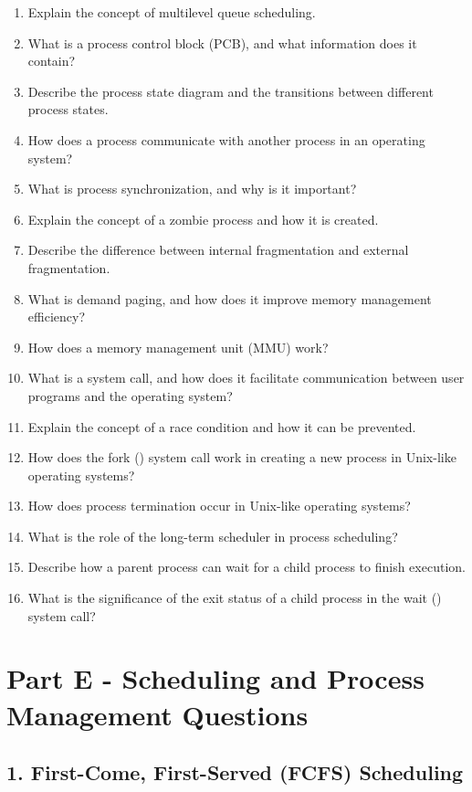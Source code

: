 \begin{enumerate}
  it used?
\item
  Explain the concept of multilevel queue scheduling.
\item
  What is a process control block (PCB), and what information does it
  contain?
\item
  Describe the process state diagram and the transitions between
  different process states.
\item
  How does a process communicate with another process in an operating
  system?
\item
  What is process synchronization, and why is it important?
\item
  Explain the concept of a zombie process and how it is created.
\item
  Describe the difference between internal fragmentation and external
  fragmentation.
\item
  What is demand paging, and how does it improve memory management
  efficiency?
\item
  How does a memory management unit (MMU) work?
\item
  What is a system call, and how does it facilitate communication
  between user programs and the operating system?
\item
  Explain the concept of a race condition and how it can be prevented.
\item
  How does the fork () system call work in creating a new process in
  Unix-like operating systems?
\item
  How does process termination occur in Unix-like operating systems?
\item
  What is the role of the long-term scheduler in process scheduling?
\item
  Describe how a parent process can wait for a child process to finish
  execution.
\item
  What is the significance of the exit status of a child process in the
  wait () system call?
\end{enumerate}

\section{Part E - Scheduling and Process Management
Questions}\label{part-e---scheduling-and-process-management-questions}

\subsection{1. First-Come, First-Served (FCFS)
Scheduling}\label{first-come-first-served-fcfs-scheduling}

